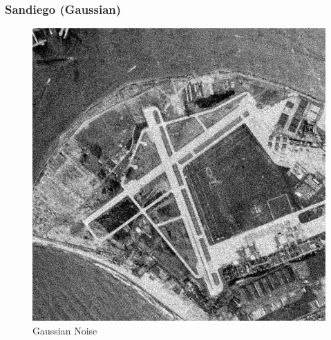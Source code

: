 \documentclass{article}
\begin{document}
    \subsubsection*{Sandiego (Gaussian)}
    
    \begin{figure}[!htb]
    \begin{center}
     \includegraphics[scale=.3]{./basic_denoising/sandiego/gaussian.png}
     \caption{Gaussian Noise}
    \end{center}
    \end{figure}
    
\end{document}
